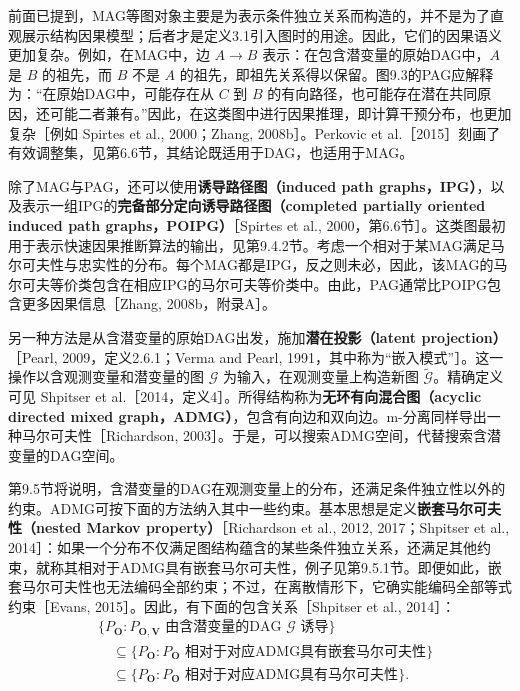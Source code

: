 前面已提到，MAG等图对象主要是为表示条件独立关系而构造的，并不是为了直观展示结构因果模型；后者才是定义3.1引入图时的用途。因此，它们的因果语义更加复杂。例如，在MAG中，边 $A\to B$ 表示：在包含潜变量的原始DAG中，$A$ 是 $B$ 的祖先，而 $B$ 不是 $A$ 的祖先，即祖先关系得以保留。图9.3的PAG应解释为：“在原始DAG中，可能存在从 $C$ 到 $B$ 的有向路径，也可能存在潜在共同原因，还可能二者兼有。”因此，在这类图中进行因果推理，即计算干预分布，也更加复杂［例如 Spirtes et al., 2000；Zhang, 2008b］。Perkovic et al.［2015］刻画了有效调整集，见第6.6节，其结论既适用于DAG，也适用于MAG。

除了MAG与PAG，还可以使用\textbf{诱导路径图（induced path graphs，IPG）}，以及表示一组IPG的\textbf{完备部分定向诱导路径图（completed partially oriented induced path graphs，POIPG）}［Spirtes et al., 2000，第6.6节］。这类图最初用于表示快速因果推断算法的输出，见第9.4.2节。考虑一个相对于某MAG满足马尔可夫性与忠实性的分布。每个MAG都是IPG，反之则未必，因此，该MAG的马尔可夫等价类包含在相应IPG的马尔可夫等价类中。由此，PAG通常比POIPG包含更多因果信息［Zhang, 2008b，附录A］。

另一种方法是从含潜变量的原始DAG出发，施加\textbf{潜在投影（latent projection）}［Pearl, 2009，定义2.6.1；Verma and Pearl, 1991，其中称为“嵌入模式”］。这一操作以含观测变量和潜变量的图 $\mathcal G$ 为输入，在观测变量上构造新图 $\widetilde{\mathcal G}$。精确定义可见 Shpitser et al.［2014，定义4］。所得结构称为\textbf{无环有向混合图（acyclic directed mixed graph，ADMG）}，包含有向边和双向边。m-分离同样导出一种马尔可夫性［Richardson, 2003］。于是，可以搜索ADMG空间，代替搜索含潜变量的DAG空间。

第9.5节将说明，含潜变量的DAG在观测变量上的分布，还满足条件独立性以外的约束。ADMG可按下面的方法纳入其中一些约束。基本思想是定义\textbf{嵌套马尔可夫性（nested Markov property）}［Richardson et al., 2012, 2017；Shpitser et al., 2014］：如果一个分布不仅满足图结构蕴含的某些条件独立关系，还满足其他约束，就称其相对于ADMG具有嵌套马尔可夫性，例子见第9.5.1节。即便如此，嵌套马尔可夫性也无法编码全部约束；不过，在离散情形下，它确实能编码全部等式约束［Evans, 2015］。因此，有下面的包含关系［Shpitser et al., 2014］：
\[
\begin{aligned}
 &\{P_{\mathbf O}:P_{\mathbf O,\mathbf V}\text{ 由含潜变量的DAG }\mathcal G\text{ 诱导}\}\\
 &\quad\subseteq\{P_{\mathbf O}:P_{\mathbf O}\text{ 相对于对应ADMG具有嵌套马尔可夫性}\}\\
 &\quad\subseteq\{P_{\mathbf O}:P_{\mathbf O}\text{ 相对于对应ADMG具有马尔可夫性}\}.
\end{aligned}
\]


